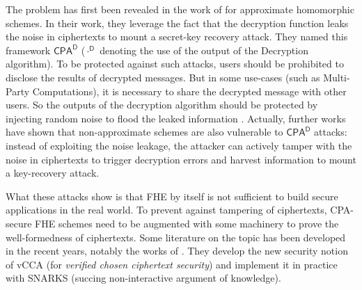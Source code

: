 The problem has first been revealed in the work of \cite{EC:LiMic21} for approximate homomorphic schemes. In their work, they leverage the fact that the decryption function leaks the noise in ciphertexts to mount a secret-key recovery attack. They named this framework $\textsf{CPA}^\textsf{D}$ ($\cdot ^ \textsf{D}$ denoting the use of the output of the Decryption algorithm). To be protected against such attacks, users should be prohibited to disclose the results of decrypted messages. But in some use-cases (such as Multi-Party Computations), it is necessary to share the decrypted message with other users. So the outputs of the decryption algorithm should be protected by injecting random noise to flood the leaked information \cite{EPRINT:CheHonKim20}. Actually, further works \cite{C:CSBB24, CCS:CCPSS24} have shown that non-approximate schemes are also vulnerable to $\textsf{CPA}^\textsf{D}$ attacks: instead of exploiting the noise leakage, the attacker can actively tamper with the noise in ciphertexts to trigger decryption errors and harvest information to mount a key-recovery attack.


What these attacks show is that \gls{FHE} by itself is not sufficient to build secure applications in the real world. To prevent against tampering of ciphertexts, \textsf{CPA}-secure \gls{FHE} schemes need to be augmented with some machinery to prove the well-formedness of ciphertexts. Some literature on the topic has been developed in the recent years, notably the works of \cite{EC:ManNgu24, CiC:BCFPPR25}. They develop the new security notion of \textsf{vCCA} (for \textit{verified chosen ciphertext security}) and implement it in practice with SNARKS \cite{SNARKS} (succing non-interactive argument of knowledge). 


